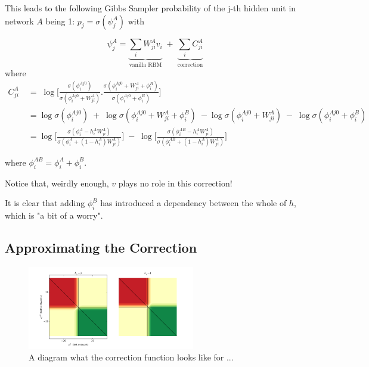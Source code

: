 This leads to the following Gibbs Sampler probability of the j-th hidden unit in network $A$ being 1: $p_j = \sigma(\psi_j^A)$ with

$$\psi_j^A = \underbrace{\sum_i W^A_{ji} v_i}_\text{vanilla RBM} \; + \; \underbrace{\sum_i C^A_{ji}}_\text{correction} $$
where
$$
\begin{aligned}
C^A_{ji} \; &= \;\log \bigg[ \frac{\sigma (\phi_i^{Aj0})}{\sigma (\phi_i^{Aj0} + W^A_{ji})} . \frac{\sigma (\phi_i^{Aj0} + W_{ji}^A + \phi_i^B) }{\sigma (\phi_i^{Aj0} + \phi_i^B)} \bigg]
\\
&= \log \sigma(\phi_i^{Aj0})  \; + \; \log \sigma (\phi_i^{Aj0} + W^A_{ji} + \phi_i^B) \;- \log \sigma (\phi_i^{Aj0} + W^A_{ji})  \; - \; \log \sigma ( \phi_i^{Aj0} + \phi_i^B)
\\
&= \log \bigg[ \frac{\sigma(\phi_i^{A} - h^A_i W^A_{ji})}{\sigma (\phi_i^{A} + (1-h^A_i) W^A_{ji})} \bigg]  \; - \; \log \bigg[ \frac{ \sigma ( \phi_i^{AB} - h^A_i W^A_{ji})}{\sigma (\phi_i^{AB} + (1-h^A_i) W^A_{ji})} \bigg]
\end{aligned} $$

where $\phi_i^{AB} = \phi_i^{A} + \phi_i^{B}$.

Notice that, weirdly enough, $v$ plays no role in this correction!

It is clear that adding $\phi^B_i$ has introduced a dependency between the whole of $h$, which is "a bit of a worry".


\subsection{Approximating the Correction}

\begin{figure}[h]
\begin{center}
  \includegraphics[width = 0.65\textwidth]{Assets/correction.png}
\caption{A diagram what the correction function looks like for ...}
\label{F:Correction-Plot}
\end{center}
\end{figure}

